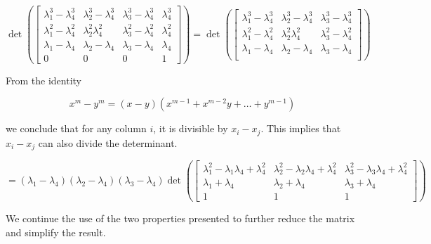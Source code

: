 \begin{equation*}
\det\left( \begin{bmatrix}
  \lambda_1^3 -\lambda_4^3 & \lambda_2^3 -\lambda_4^3 & \lambda_3^3 -\lambda_4^3 & \lambda_4^3 \\
  \lambda_1^2 - \lambda_4^2 & \lambda_2^2 \lambda_4^2 & \lambda_3^2 - \lambda_4^2 & \lambda_4^2 \\
  \lambda_1 - \lambda_4 & \lambda_2 - \lambda_4& \lambda_3- \lambda_4 & \lambda_4 \\
  0 & 0 & 0 & 1
 \end{bmatrix}\right) =
 \det\left( \begin{bmatrix}
  \lambda_1^3 -\lambda_4^3 & \lambda_2^3 -\lambda_4^3 & \lambda_3^3 -\lambda_4^3 \\
  \lambda_1^2 - \lambda_4^2 & \lambda_2^2 \lambda_4^2 & \lambda_3^2 - \lambda_4^2 \\
  \lambda_1 - \lambda_4 & \lambda_2 - \lambda_4& \lambda_3- \lambda_4\\
 \end{bmatrix}\right)
\end{equation*}

From the identity

\begin{equation*}
 x^m - y^m = (x-y)(x^{m-1}+ x^{m-2}y +  \dots + y^{m-1})
\end{equation*}

we conclude that for any column $i$, it is divisible by
$x_i - x_j$.
This implies that $x_i - x_j$ can also divide the determinant.

\begin{equation*}
 = (\lambda_1-\lambda_4)(\lambda_2-\lambda_4)(\lambda_3-\lambda_4)
 \det\left( \begin{bmatrix}
             \lambda_1^2-\lambda_1\lambda_4 + \lambda_4^2 & \lambda_2^2-\lambda_2\lambda_4 + \lambda_4^2 &\lambda_3^2-\lambda_3\lambda_4 + \lambda_4^2\\
             \lambda_1+\lambda_4 & \lambda_2+\lambda_4 & \lambda_3+\lambda_4 \\
             1 & 1 & 1
            \end{bmatrix}
 \right)
\end{equation*}

We continue the use of the two properties presented to further reduce the matrix
and simplify the result.

